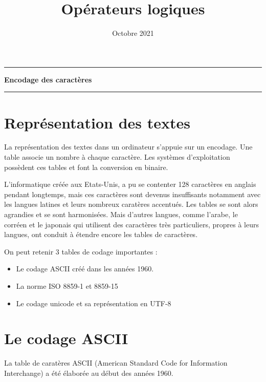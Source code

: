 \documentclass[11pt]{article}
\title{Opérateurs logiques}
\date{Octobre 2021}
\makeatletter
\providecommand{\tightlist}{%
      \setlength{\itemsep}{0pt}\setlength{\parskip}{0pt}}
\renewcommand\maketitle[1]{
\hrule\medskip
{\raggedright %
\begin{center}
{\Huge \bfseries \sffamily #1 }\\[4ex] 
\hrule \bigskip
\end{center}}} %
\makeatother
\begin{document}
    
    \maketitle{Encodage des caractères}
    
    

%    

    \hypertarget{repruxe9sentation-des-textes}{%
\section{Représentation des textes}\label{repruxe9sentation-des-textes}}

La représentation des textes dans un ordinateur s'appuie sur un
encodage. Une table associe un nombre à chaque caractère. Les systèmes
d'exploitation possèdent ces tables et font la conversion en binaire.

L'informatique créée aux Etats-Unis, a pu se contenter 128 caractères en
anglais pendant longtemps, mais ces caractères sont devenus insuffisants
notamment avec les langues latines et leurs nombreux caratères
accentués. Les tables se sont alors agrandies et se sont harmonisées.
Mais d'autres langues, comme l'arabe, le corréen et le japonais qui
utilisent des caractères très particuliers, propres à leurs langues, ont
conduit à étendre encore les tables de caractères.

On peut retenir 3 tables de codage importantes :

\begin{itemize}
\tightlist
\item
  Le codage ASCII créé dans les années 1960.
\item
  La norme ISO 8859-1 et 8859-15
\item
  Le codage unicode et sa représentation en UTF-8
\end{itemize}

\hypertarget{le-codage-ascii}{%
\section{Le codage ASCII}\label{le-codage-ascii}}

La table de caratères ASCII (American Standard Code for Information
Interchange) a été élaborée au début des années 1960.
\end{document}
